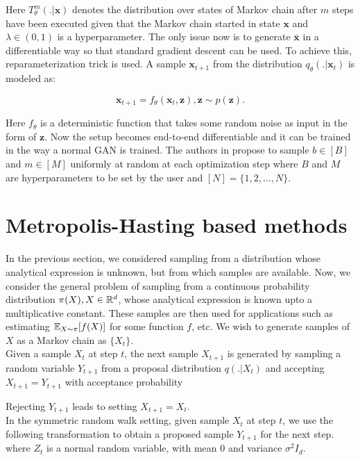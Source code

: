 \documentclass[letterpaper,english,10pt]{article}
\begin{document}
Here $T_\theta^m(. | \mathbf{x})$ denotes the distribution over states of Markov chain after $m$ steps have been executed given that the Markov chain started in state $\mathbf{x}$ and $\lambda \in (0, 1)$ is a hyperparameter. The only issue now is to generate $\bar{\mathbf{x}}$ in a differentiable way so that standard gradient descent can be used. To achieve this, reparameterization trick is used. A sample $\mathbf{x}_{t + 1}$ from the distribution $q_\theta(. | \mathbf{x}_t)$ is modeled as:

$$\mathbf{x}_{t + 1} = f_\theta(\mathbf{x}_t, \mathbf{z}), \mathbf{z} \sim p(\mathbf{z}).$$

Here $f_\theta$ is a deterministic function that takes some random noise as input in the form of $\mathbf{z}$. Now the setup becomes end-to-end differentiable and it can be trained in the way a normal GAN is trained. The authors in \cite{SongEtAl:2017:ANiceMCAdversarialTrainingForMCMC} propose to sample $b \in [B]$ and $m \in [M]$ uniformly at random at each optimization step where $B$ and $M$ are hyperparameters to be set by the user and $[N] = \{1, 2, \dots, N\}$.


\section{Metropolis-Hasting based methods}

In the previous section, we considered sampling from a distribution whose analytical expression is unknown, but from which samples are available. Now, we consider the general problem of sampling from a continuous probability distribution $\pi(X), X \in \mathbb{R}^d$, whose analytical expression is known upto a multiplicative constant. These samples are then used for applications such as estimating $\mathbb{E}_{X \sim \pi} [f(X)]$ for some function $f$, etc. We wish to generate samples of $X$ as a Markov chain as $\{ X_t \}$. \\

Given a sample $X_t$ at step $t$, the next sample $X_{t+1}$ is generated by sampling a random variable $Y_{t+1}$ from a proposal distribution $q(.|X_t)$ and accepting $X_{t+1} = Y_{t+1}$ with acceptance probability


Rejecting $Y_{t+1}$ leads to setting $X_{t+1} = X_t$.\\

In the symmetric random walk setting, given sample $X_t$ at step $t$, we use the following transformation to obtain a proposed sample $Y_{t+1}$ for the next step.
where $Z_t$ is a normal random variable, with mean $0$ and variance $\sigma^2 I_d$.
\end{document}
